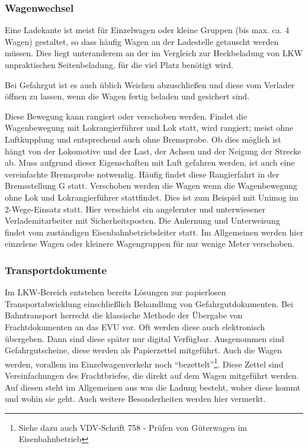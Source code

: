 \subsubsection{Wagenwechsel}
Eine Ladekante ist meist für Einzelwagen oder kleine Gruppen (bis max. ca. 4 Wagen) gestaltet, so dass häufig Wagen an der Ladestelle getauscht werden müssen. Dies liegt unteranderem an der im Vergleich zur Heckbeladung von LKW unpraktischen Seitenbeladung, für die viel Platz benötigt wird.\par
Bei Gefahrgut ist es auch üblich Weichen abzuschließen und diese vom Verlader öffnen zu lassen, wenn die Wagen fertig beladen und gesichert sind.\par
Diese Bewegung kann rangiert oder verschoben werden. Findet die Wagenbewegung mit Lokrangierführer und Lok statt, wird rangiert; meist ohne Luftkupplung und entsprechend auch ohne Bremsprobe. Ob dies möglich ist hängt von der Lokomotive und der Last, der Achsen und der Neigung der Strecke ab. Muss aufgrund dieser Eigenschaften mit Luft gefahren werden, ist auch eine vereinfachte Bremsprobe notwendig. Häufig findet diese Rangierfahrt in der Bremsstellung G statt. Verschoben werden die Wagen wenn die Wagenbewegung ohne Lok und Lokrangierführer stattfindet. Dies ist zum Beispiel mit Unimog im 2-Wege-Einsatz statt. Hier verschiebt ein angelernter und unterwiesener Verlademitarbeiter mit Sicherheitsposten. Die Anlernung und Unterweisung findet vom zuständigen Eisenbahnbetriebsleiter statt. Im Allgemeinen werden hier einzelene Wagen oder kleinere Wagengruppen für nur wenige Meter verschoben.
\subsubsection{Transportdokumente}\label{sec:Transdoc}
Im LKW-Bereich entstehen bereits Lösungen zur papierlosen Transportabwicklung einschließlich Behandlung von Gefahrgutdokumenten. Bei Bahntransport herrscht die klassische Methode der Übergabe von Frachtdokumenten an das \acrshort{EVU} vor. Oft werden diese auch elektronisch übergeben. Dann sind diese später nur digital Verfügbar. Ausgenommen sind Gefahrgutscheine, diese werden als Papierzettel mitgeführt. Auch die Wagen werden, vorallem im Einzelwagenverkehr noch "`bezettelt"'\footnote{Siehe dazu auch VDV-Schrift 758 - Prüfen von Güterwagen im Eisenbahnbetrieb}. Diese Zettel sind Vereinfachungen des Frachtbriefes, die direkt auf dem Wagen mitgeführt werden. Auf diesen steht im Allgemeinen aus was die Ladung besteht, woher diese kommt und wohin sie geht. Auch weitere Besonderheiten werden hier vermerkt.
